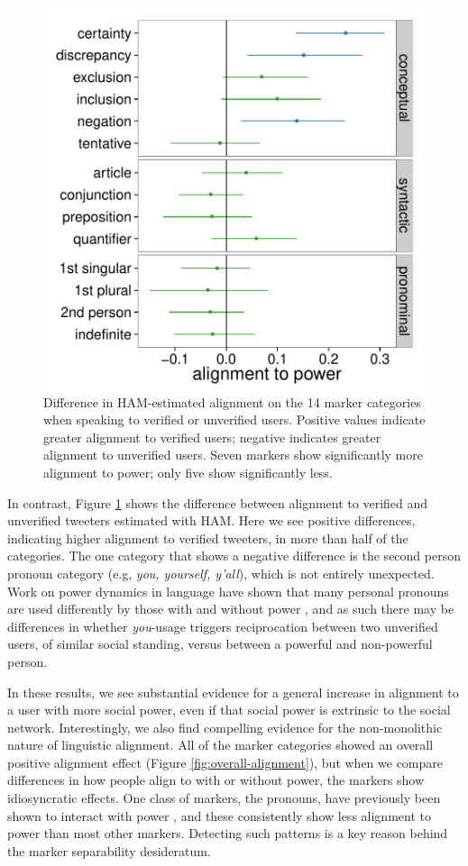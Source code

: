 \documentclass{acm_proc_article-sp}
\begin{document}
\begin{figure}[t]
\centering
\includegraphics[width=.9\columnwidth]{graphics/www2016_ourpowerdiff_verif_final95.pdf}
\caption{Difference in HAM-estimated alignment on the 14 marker categories when speaking to verified or unverified users. Positive values indicate greater alignment to verified users; negative indicates greater alignment to unverified users. Seven markers show significantly more alignment to power; only five show significantly less.}\label{fig:our-verified}
\end{figure}

In contrast, Figure \ref{fig:our-verified} shows the difference between alignment to verified and unverified tweeters estimated with HAM. Here we see positive differences, indicating higher alignment to verified tweeters, in more than half of the categories.  The one category that shows a negative difference is the second person pronoun category (e.g, \textit{you, yourself, y'all}), which is not entirely unexpected. Work on power dynamics in language have shown that many personal pronouns are used differently by those with and without power \cite{KacewiczEtAl2013,ChungPennebaker2007}, and as such there may be differences in whether \textit{you}-usage triggers reciprocation between two unverified users, of similar social standing, versus between a powerful and non-powerful person.

In these results, we see substantial evidence for a general increase in alignment to a user with more social power, even if that social power is extrinsic to the social network.  Interestingly, we also find compelling evidence for the non-monolithic nature of linguistic alignment. All of the marker categories showed an overall positive alignment effect (Figure \ref{fig:overall-alignment}), but when we compare differences in how people align to with or without power, the markers show idiosyncratic effects.  One class of markers, the pronouns, have previously been shown to interact with power \cite{KacewiczEtAl2013}, and these consistently show less alignment to power than most other markers. Detecting such patterns is a key reason behind the marker separability desideratum.
\end{document}
